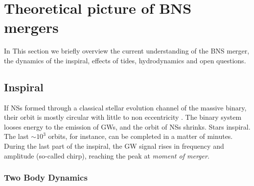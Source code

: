 
\section{Theoretical picture of \ac{BNS} mergers}

In This section we briefly overview the current understanding of the \ac{BNS} 
merger, the dynamics of the inspiral, effects of tides, \pmerg{} hydrodynamics 
and open questions.


\subsection{Inspiral}

If \acp{NS} formed through a classical stellar evolution channel of the massive binary, 
their orbit is mostly circular with little to non eccentricity \cite{Aasi:2013wya}. 
%
The binary system looses energy to the emission of \acp{GW}, and the orbit of \acp{NS} 
shrinks. Stars inspiral. The last ${\sim}10^3$ orbits, for instance, can be completed in 
a matter of minutes. During the last part of the inspiral, the \ac{GW} signal rises in 
frequency and amplitude (so-called chirp), reaching the peak at \textit{moment of merger}.


\subsubsection{Two Body Dynamics}


